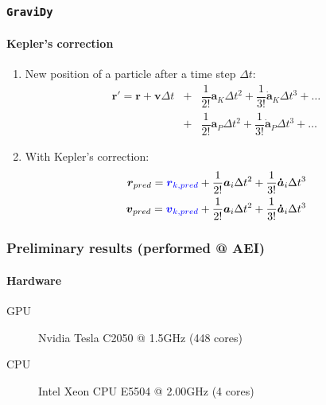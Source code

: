\begin{frame}
    \frametitle{\texttt{GraviDy}}
    \framesubtitle{Kepler's correction}
    \begin{enumerate}
        \item New position of a particle after a time step $\Delta t$:
        \begin{eqnarray}
            \boldsymbol{r'} =    \boldsymbol{      r}              +
                                       \boldsymbol{      v} \Delta t     &+&
                         \dfrac{1}{2!} \boldsymbol{      a}_{K} \Delta t^{2} +
                         \dfrac{1}{3!} \boldsymbol{\dot{a}}_{K} \Delta t^{3} + \ldots \nonumber\\
                          &+& 
                         \dfrac{1}{2!} \boldsymbol{      a}_{P} \Delta t^{2} +
                         \dfrac{1}{3!} \boldsymbol{\dot{a}}_{P} \Delta t^{3} + \ldots
        \end{eqnarray}
        \item With Kepler's correction:
        \begin{eqnarray}
            \boldsymbol{r}_{pred} =    \textcolor{blue}{\boldsymbol{      r}_{k,pred}}         +
                         \dfrac{1}{2!}       \boldsymbol{      a}_{i} \Delta t^{2} +
                         \dfrac{1}{3!}       \boldsymbol{\dot{a}}_{i} \Delta t^{3} \\
            \boldsymbol{v}_{pred} =    \textcolor{blue}{\boldsymbol{      v}_{k,pred}}         +
                         \dfrac{1}{2!}       \boldsymbol{      a}_{i} \Delta t^{2} +
                         \dfrac{1}{3!}       \boldsymbol{\dot{a}}_{i} \Delta t^{3}
        \end{eqnarray}

    \end{enumerate}
\end{frame}

\begin{frame}
    \frametitle{Preliminary results (performed @ AEI)}
    \framesubtitle{Hardware}
    \begin{description}
        \item[GPU]
            Nvidia Tesla C2050 @ 1.5GHz (448 cores)
        \item[CPU]
            Intel Xeon CPU E5504  @ 2.00GHz (4 cores)
    \end{description}
\end{frame}

